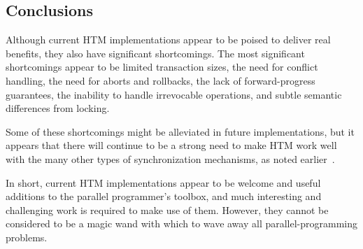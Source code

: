 \subsection{Conclusions}
\label{sec:future:Conclusions}

Although current HTM implementations appear to be poised to deliver real
benefits, they also have significant shortcomings.
The most significant shortcomings appear to be
limited transaction sizes,
the need for conflict handling, the need for aborts and rollbacks,
the lack of forward-progress guarantees,
the inability to handle irrevocable operations,
and subtle semantic differences
from locking.

Some of these shortcomings might be alleviated in future implementations,
but it appears that there will continue to be a strong need to make
HTM work well with the many other types of synchronization mechanisms,
as noted earlier~\cite{McKenney2007PLOSTM,PaulEMcKenney2010OSRGrassGreener}.

In short, current HTM implementations appear to be welcome and useful
additions to the parallel programmer's toolbox, and much interesting
and challenging work is required to make use of them.
However, they cannot be
considered to be a magic wand with which to wave away all parallel-programming
problems.
